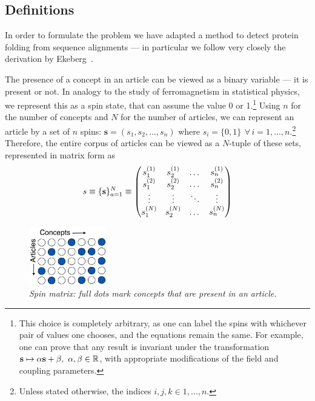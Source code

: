\documentclass[a4paper,12pt,twoside]{article}
\def \be {\begin{equation}}
\def \ee {\end{equation}}
\def \bf {\textbf}
\begin{document}
\subsection{Definitions}
In order to formulate the problem we have adapted a method to detect protein folding from sequence alignments --- in particular we follow very closely the derivation by Ekeberg~\cite{eke2012}. 

The presence of a concept in an article can be viewed as a binary variable --- it is present or not.
In analogy to the study of ferromagnetism in statistical physics, we represent this as a spin state, that can assume the value 0 or 1.\footnote{This choice is completely arbitrary, as one can label the spins with whichever pair of values one chooses, and the equations remain the same. For example, one can prove that any result is invariant under the transformation $\bf s \mapsto \alpha \bf s + \beta,~\alpha,\beta \in \mathbb{R}$, with appropriate modifications of the field and coupling parameters.}
Using $n$ for the number of concepts and $N$ for the number of articles, we can represent an article by a set of $n$ spins: $\bf{s}=(s_1,s_2,\dots,s_n)$ where $s_i = \{0,1\}\,~\forall\,i=1,\dots,n$.\footnote{Unless stated otherwise, the indices $i,j,k \in 1,\dots,n$.} Therefore, the entire corpus of articles can be viewed as a $N$-tuple of these sets, represented in matrix form as
\be
s\equiv \{\bf s\}_{a=1}^N \equiv
  \begin{pmatrix}
  s_1^{(1)}  & s_2^{(1)} & \dots  & s_n^{(1)}  \\
  s_1^{(2)}  & s_2^{(2)} & \dots  & s_n^{(2)}  \\
  \vdots  & \vdots & \ddots  & \vdots \\
  s_1^{(N)}  & s_2^{(N)} & \dots  & s_n^{(N)}  \\
  \end{pmatrix}
  \label{eq:smatrix}
\ee
\begin{figure}
  \centerline{\includegraphics[width=0.3\textwidth]{../img/dots.png}}
  \caption{\em Spin matrix: full dots mark concepts that are present in an article.}
  \label{fig:dots}
\end{figure}
\end{document}
